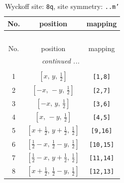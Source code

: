 \documentclass[fleqn,8pt]{jsarticle}
\begin{document}
\begin{longtable}{ccc}
\caption{Wyckoff site: {\tt 8q}, site symmetry: {\tt ..m'}}
 \\
 \hline \hline
No. & position & mapping \\ \hline \endfirsthead

\multicolumn{2}{l}{\tablename\ \thetable{}} \\
 \hline \hline
No. & position & mapping \\ \hline \endhead

 \hline \hline
\multicolumn{2}{r}{\footnotesize\it continued ...} \\ \endfoot

 \hline \hline
\multicolumn{2}{r}{} \\ \endlastfoot

1 & $\left[ x,\, y,\, \frac{1}{2} \right]$ & {\tt [1,8]} \\ \hline
2 & $\left[ - x,\, - y,\, \frac{1}{2} \right]$ & {\tt [2,7]} \\ \hline
3 & $\left[ - x,\, y,\, \frac{1}{2} \right]$ & {\tt [3,6]} \\ \hline
4 & $\left[ x,\, - y,\, \frac{1}{2} \right]$ & {\tt [4,5]} \\ \hline
5 & $\left[ x + \frac{1}{2},\, y + \frac{1}{2},\, \frac{1}{2} \right]$ & {\tt [9,16]} \\ \hline
6 & $\left[ \frac{1}{2} - x,\, \frac{1}{2} - y,\, \frac{1}{2} \right]$ & {\tt [10,15]} \\ \hline
7 & $\left[ \frac{1}{2} - x,\, y + \frac{1}{2},\, \frac{1}{2} \right]$ & {\tt [11,14]} \\ \hline
8 & $\left[ x + \frac{1}{2},\, \frac{1}{2} - y,\, \frac{1}{2} \right]$ & {\tt [12,13]} \\
\end{longtable}
\renewcommand{\arraystretch}{1.2}
\end{document}
